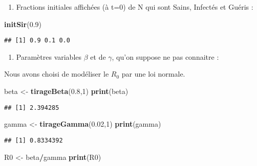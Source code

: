 \documentclass[
]{article}
\newenvironment{Shaded}{\begin{snugshade}}{\end{snugshade}}
\newcommand{\DecValTok}[1]{\textcolor[rgb]{0.00,0.00,0.81}{#1}}
\newcommand{\FloatTok}[1]{\textcolor[rgb]{0.00,0.00,0.81}{#1}}
\newcommand{\KeywordTok}[1]{\textcolor[rgb]{0.13,0.29,0.53}{\textbf{#1}}}
\newcommand{\NormalTok}[1]{#1}
\newcommand{\OperatorTok}[1]{\textcolor[rgb]{0.81,0.36,0.00}{\textbf{#1}}}
\newcommand{\StringTok}[1]{\textcolor[rgb]{0.31,0.60,0.02}{#1}}
\providecommand{\tightlist}{%
  \setlength{\itemsep}{0pt}\setlength{\parskip}{0pt}}
\begin{document}
\begin{enumerate}
\def\labelenumi{\alph{enumi}.}
\tightlist
\item
  Fractions initiales affichées (à t=0) de N qui sont Sains, Infectés et
  Guéris :
\end{enumerate}

\begin{Shaded}
\begin{Highlighting}[]
\KeywordTok{initSir}\NormalTok{(}\FloatTok{0.9}\NormalTok{)}
\end{Highlighting}
\end{Shaded}

\begin{verbatim}
## [1] 0.9 0.1 0.0
\end{verbatim}

\begin{enumerate}
\def\labelenumi{\alph{enumi}.}
\setcounter{enumi}{1}
\tightlist
\item
  Paramètres variables \(\beta\) et de \(\gamma\), qu'on suppose ne pas
  connaitre :
\end{enumerate}

Nous avons choisi de modéliser le \(R_0\) par une loi normale.

\begin{Shaded}
\begin{Highlighting}[]
\NormalTok{beta <-}\StringTok{ }\KeywordTok{tirageBeta}\NormalTok{(}\FloatTok{0.8}\NormalTok{,}\DecValTok{1}\NormalTok{)}
\KeywordTok{print}\NormalTok{(beta)}
\end{Highlighting}
\end{Shaded}

\begin{verbatim}
## [1] 2.394285
\end{verbatim}

\begin{Shaded}
\begin{Highlighting}[]
\NormalTok{gamma <-}\StringTok{ }\KeywordTok{tirageGamma}\NormalTok{(}\FloatTok{0.02}\NormalTok{,}\DecValTok{1}\NormalTok{)}
\KeywordTok{print}\NormalTok{(gamma)}
\end{Highlighting}
\end{Shaded}

\begin{verbatim}
## [1] 0.8334392
\end{verbatim}

\begin{Shaded}
\begin{Highlighting}[]
\NormalTok{R0 <-}\StringTok{ }\NormalTok{beta}\OperatorTok{/}\NormalTok{gamma}
\KeywordTok{print}\NormalTok{(R0)}
\end{Highlighting}
\end{Shaded}
\end{document}
